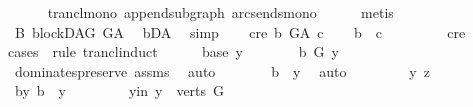 \begin{isabellebody}
\ \ \ \ \isamarkupfalse%
\ trancl{\isacharunderscore}{\kern0pt}mono\ append{\isacharunderscore}{\kern0pt}subgraph\ arcs{\isacharunderscore}{\kern0pt}ends{\isacharunderscore}{\kern0pt}mono\isanewline
\ \ \ \ \isamarkupfalse%
\ metis\isanewline
{}\isamarkupfalse%
\ \isanewline
\ \ \isamarkupfalse%
\ B{}{\isacharcolon}{\kern0pt}\ blockDAG\ {\isachardoublequoteopen}G{\isacharunderscore}{\kern0pt}A{\isachardoublequoteclose}\ \isamarkupfalse%
\ bD{\isacharunderscore}{\kern0pt}A\ \isamarkupfalse%
\ simp\isanewline
\ \ \isamarkupfalse%
\ c{\isacharunderscore}{\kern0pt}re{\isacharcolon}{\kern0pt}\ {\isachardoublequoteopen}b\ {\isasymrightarrow}\isactrlsup {\isacharplus}{\kern0pt}\isactrlbsub G{\isacharunderscore}{\kern0pt}A\isactrlesub \ c{\isachardoublequoteclose}\isanewline
\ \ \isamarkupfalse%
\ {\isachardoublequoteopen}b\ {\isasymrightarrow}\isactrlsup {\isacharplus}{\kern0pt}\ c{\isachardoublequoteclose}\ \ \ \isanewline
\ \ \ \ \isamarkupfalse%
\ c{\isacharunderscore}{\kern0pt}re\isanewline
\ \ \isamarkupfalse%
{\isacharparenleft}{\kern0pt}cases\ \ rule{\isacharcolon}{\kern0pt}\ trancl{\isacharunderscore}{\kern0pt}induct{\isacharparenright}{\kern0pt}\isanewline
\ \ \ \ \isamarkupfalse%
\ {\isacharparenleft}{\kern0pt}base\ y{\isacharparenright}{\kern0pt}\isanewline
\ \ \ \ \isamarkupfalse%
\ \isamarkupfalse%
\ {\isachardoublequoteopen}b\ {\isasymrightarrow}\isactrlbsub G\isactrlesub \ y{\isachardoublequoteclose}\ \isamarkupfalse%
\ dominates{\isacharunderscore}{\kern0pt}preserve\ assms{\isacharparenleft}{\kern0pt}{}{\isacharparenright}{\kern0pt}\ \isamarkupfalse%
\ auto\isanewline
\ \ \ \ \isamarkupfalse%
\ \isamarkupfalse%
\ {\isachardoublequoteopen}b\ {\isasymrightarrow}\isactrlsup {\isacharplus}{\kern0pt}\ y{\isachardoublequoteclose}\ \isamarkupfalse%
\ auto\isanewline
\ \ \isamarkupfalse%
\isanewline
\ \ \ \ \isamarkupfalse%
\ y\ z\ \ \ \ \isanewline
\ \ \ \ \isamarkupfalse%
\ b{\isacharunderscore}{\kern0pt}y{\isacharcolon}{\kern0pt}\ {\isachardoublequoteopen}b\ {\isasymrightarrow}\isactrlsup {\isacharplus}{\kern0pt}\ y{\isachardoublequoteclose}\ \isanewline
\ \ \ \ \isamarkupfalse%
\ \isamarkupfalse%
\ y{\isacharunderscore}{\kern0pt}in{\isacharcolon}{\kern0pt}\ {\isachardoublequoteopen}y\ {\isasymin}\ verts\ G{\isachardoublequoteclose}\ \isamarkupfalse%

\end{isabellebody}

